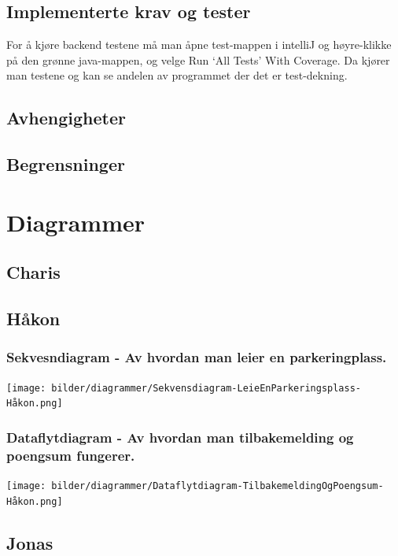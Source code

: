 \documentclass[12pt]{article}
\begin{document}
    \subsection{Implementerte krav og tester}
    For å kjøre backend testene må man åpne test-mappen i intelliJ og høyre-klikke på den grønne java-mappen, og velge Run ‘All Tests’ With Coverage. Da kjører man testene og kan se andelen av programmet der det er test-dekning.

    \subsection{Avhengigheter}

    \subsection{Begrensninger}

\section{Diagrammer}

    \subsection{Charis}

    \newpage
    \subsection{Håkon}

        \subsubsection{Sekvesndiagram - Av hvordan man leier en parkeringplass.}
        \texttt{[image: bilder/diagrammer/Sekvensdiagram-LeieEnParkeringsplass-Håkon.png]}

        \subsubsection{Dataflytdiagram - Av hvordan man tilbakemelding og poengsum fungerer.}
        \texttt{[image: bilder/diagrammer/Dataflytdiagram-TilbakemeldingOgPoengsum-Håkon.png]}

    \subsection{Jonas}
\end{document}
